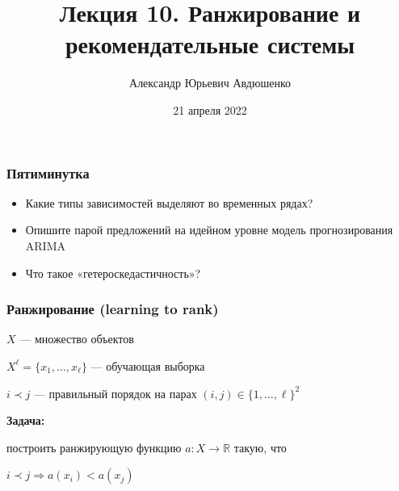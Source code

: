 \documentclass[fullscreen=true, bookmarks=true, hyperref={pdfencoding=unicode}]{beamer}
\title{Лекция 10. Ранжирование и рекомендательные системы}
\author{Александр Юрьевич Авдюшенко}
\institute{МКН СПбГУ}
\date{21 апреля 2022}
\begin{document}

\begin{frame}
\transdissolve[duration=0.2]
\titlepage
\end{frame}


\begin{frame}
  \frametitle{Пятиминутка}
  \begin{itemize}
    \item Какие типы зависимостей выделяют во временных рядах?
    \item Опишите парой предложений на идейном уровне модель прогнозирования ARIMA
    \item Что такое «гетероскедастичность»?
  \end{itemize}
\end{frame}


\begin{frame}
  \frametitle{Ранжирование (learning to rank)}

  $X$ — множество объектов

  $X^\ell = \{x_1, \dots, x_\ell\}$ — обучающая выборка

  $i \prec j$ — правильный порядок на парах $(i, j) \in \{1, \dots, \ell\}^2$

  \vspace{1cm}
  {\bf Задача:}

  построить ранжирующую функцию $a: X \to \mathbb{R}$ такую, что

  $i \prec j \Rightarrow a(x_i) < a(x_j)$
\end{frame}
\end{document}
